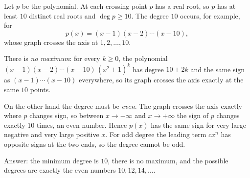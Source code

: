 Let $p$ be the polynomial. At each crossing point $p$ has a real root, so $p$ has at least $10$ distinct real roots and $\deg p\ge10$. The degree $10$ occurs, for example, for
\[
p(x)=(x-1)(x-2)\cdots(x-10),
\]
whose graph crosses the axis at $1,2,\dots,10$.

There is \emph{no maximum}: for every $k\ge0$, the polynomial $(x-1)(x-2)\cdots(x-10)\,(x^2+1)^k$ has degree $10+2k$ and the same sign as $(x-1)\cdots(x-10)$ everywhere, so its graph crosses the axis exactly at the same $10$ points.

On the other hand the degree must be \emph{even}. The graph crosses the axis exactly where $p$ changes sign, so between $x\to-\infty$ and $x\to+\infty$ the sign of $p$ changes exactly $10$ times, an even number. Hence $p(x)$ has the same sign for very large negative and very large positive $x$. For odd degree the leading term $cx^n$ has opposite signs at the two ends, so the degree cannot be odd.

Answer: the minimum degree is $\boxed{10}$, there is no maximum, and the possible degrees are exactly the even numbers $10,12,14,\dots$.
